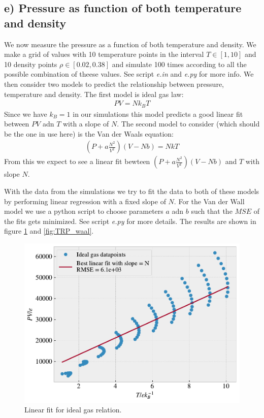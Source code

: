 \documentclass[reprint, amsmath, amssymb, aps]{revtex4-2}
\begin{document}
\subsection*{e) Pressure as function of both temperature and density}
We now measure the pressure as a function of both temperature and density. We make a grid of values with 10 temperature points in the interval $T \in [1, 10]$ and 10 density points $\rho \in [0.02, 0.38]$ and simulate 100 times according to all the possible combination of theese values. See script \textit{e.in} and \textit{e.py} for more info. We then consider two models to predict the relationship between pressure, temperature and density. The first model is ideal gas law:
\begin{align*}
  PV = Nk_BT
\end{align*}
Since we have $k_B = 1$ in our simulations this model predicts a good linear fit between $PV$ adn $T$ with a slope of $N$. The second model to consider (which should be the one in use here) is the Van der Waals equation:
\begin{align*}
  (P + a \frac{N^2}{V^2})(V-Nb) = NkT
\end{align*}
From this we expect to see a linear fit bewteen  $(P + a \frac{N^2}{V^2})(V-Nb)$ and $T$ with slope $N$. \par
With the data from the simulations we try to fit the data to both of these models by performing linear regression with a fixed slope of $N$. For the Van der Wall model we use a python script to choose parameters $a$ adn $b$ such that the $MSE$ of the fits gets minimized. See script \textit{e.py} for more details. The results are shown in figure \ref{fig:TRP_ideal} and \ref{fig:TRP_waal}.

\begin{figure}[H]
  \includegraphics[width=\linewidth]{figures/TRP_ideal.pdf}
  \caption{Linear fit for ideal gas relation.}
  \label{fig:TRP_ideal}
\end{figure}
\end{document}
